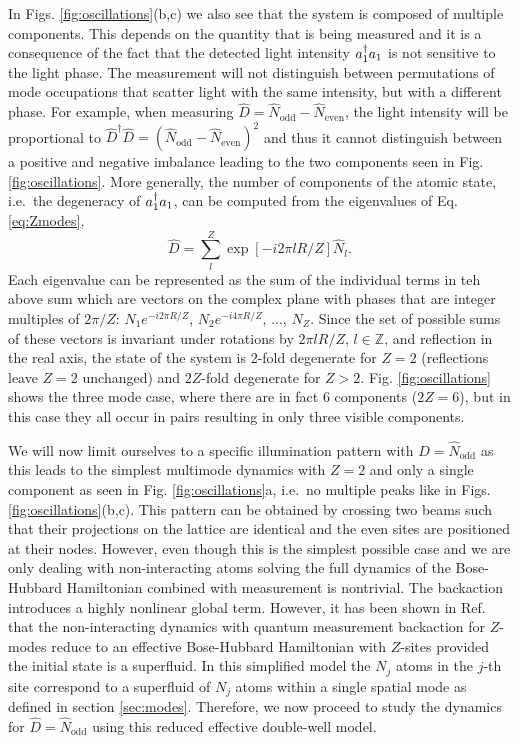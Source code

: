 In Figs. \ref{fig:oscillations}(b,c) we also see that the system is
composed of multiple components. This depends on the quantity that is
being measured and it is a consequence of the fact that the detected
light intensity $a^\dagger_1 a_1$ is not sensitive to the light phase. The
measurement will not distinguish between permutations of mode
occupations that scatter light with the same intensity, but with a
different phase. For example, when measuring
$\hat{D} = \hat{N}_\mathrm{odd} - \hat{N}_\mathrm{even}$, the light
intensity will be proportional to
$\hat{D}^\dagger \hat{D} = (\hat{N}_\mathrm{odd} -
\hat{N}_\mathrm{even})^2$ and thus it cannot distinguish between a
positive and negative imbalance leading to the two components seen in
Fig. \ref{fig:oscillations}. More generally, the number of components
of the atomic state, i.e.~the degeneracy of $a^\dagger_1 a_1$, can be
computed from the eigenvalues of Eq. \eqref{eq:Zmodes},
\begin{equation}
  \hat{D} = \sum_l^Z \exp\left[-i 2 \pi l R / Z \right] \hat{N}_l.
\end{equation}
Each eigenvalue can be represented as the sum of the individual terms
in teh above sum which are vectors on the complex plane with phases
that are integer multiples of $2 \pi / Z$: $N_1 e^{-i 2 \pi R / Z}$,
$N_2 e^{-i 4 \pi R / Z}$, ..., $N_Z$. Since the set of possible sums
of these vectors is invariant under rotations by $2 \pi l R / Z$,
$l \in \mathbb{Z}$, and reflection in the real axis, the state of the
system is 2-fold degenerate for $Z = 2$ (reflections leave $Z = 2$
unchanged) and $2Z$-fold degenerate for $Z >
2$. Fig. \ref{fig:oscillations} shows the three mode case, where there
are in fact $6$ components ($2Z = 6$), but in this case they all occur
in pairs resulting in only three visible components.

We will now limit ourselves to a specific illumination pattern with
$\hat{D} = \hat{N}_\mathrm{odd}$ as this leads to the simplest
multimode dynamics with $Z = 2$ and only a single component as seen in
Fig. \ref{fig:oscillations}a, i.e.~no multiple peaks like in
Figs. \ref{fig:oscillations}(b,c). This pattern can be obtained by
crossing two beams such that their projections on the lattice are
identical and the even sites are positioned at their nodes. However,
even though this is the simplest possible case and we are only dealing
with non-interacting atoms solving the full dynamics of the
Bose-Hubbard Hamiltonian combined with measurement is nontrivial. The
backaction introduces a highly nonlinear global term. However, it has
been shown in Ref. \cite{mazzucchi2016njp} that the non-interacting
dynamics with quantum measurement backaction for $Z$-modes reduce to
an effective Bose-Hubbard Hamiltonian with $Z$-sites provided the
initial state is a superfluid. In this simplified model the $N_j$
atoms in the $j$-th site correspond to a superfluid of $N_j$ atoms
within a single spatial mode as defined in section
\ref{sec:modes}. Therefore, we now proceed to study the dynamics for
$\hat{D} = \hat{N}_\mathrm{odd}$ using this reduced effective
double-well model.

